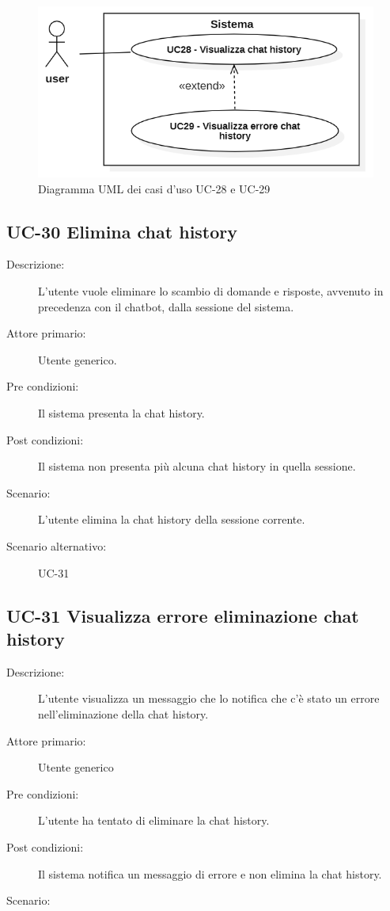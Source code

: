 \begin{figure}[H]
    \centering
    \includegraphics[width=0.9\linewidth]{UC28-29.PNG}
    \caption{Diagramma UML dei casi d'uso UC-28 e UC-29}
    \label{fig:UC28-29}
\end{figure}

\subsection{UC-30 Elimina chat history}
\begin{description}
    \item[Descrizione:] L'utente vuole eliminare lo scambio di domande e risposte, avvenuto in precedenza con il chatbot, dalla sessione del sistema.
    \item[Attore primario:] Utente generico.
    \item[Pre condizioni:] Il sistema presenta la chat history.
    \item[Post condizioni:] Il sistema non presenta più alcuna chat history in quella sessione.
    \item[Scenario:] L'utente elimina la chat history della sessione corrente.
    \item[Scenario alternativo:] UC-31
\end{description}

\subsection{UC-31 Visualizza errore eliminazione chat history }
\begin{description}
    \item[Descrizione:] L'utente visualizza un messaggio che lo notifica che c'è stato un errore nell'eliminazione della chat history.
    \item[Attore primario:] Utente generico
    \item[Pre condizioni:] L'utente ha tentato di eliminare la chat history.
    \item[Post condizioni:] Il sistema notifica un messaggio di errore e non elimina la chat history.
    \item[Scenario:] 
\end{description}

